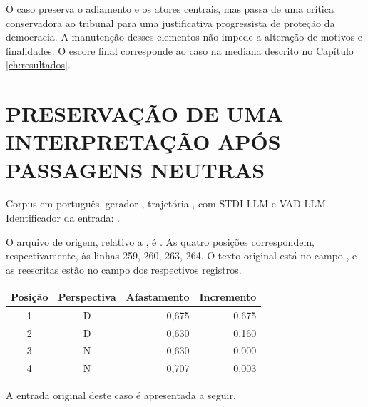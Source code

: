 O caso preserva o adiamento e os atores centrais, mas passa de uma crítica conservadora ao tribunal para uma justificativa progressista de proteção da democracia. A manutenção desses elementos não impede a alteração de motivos e finalidades. O escore final corresponde ao caso na mediana descrito no Capítulo \ref{ch:resultados}.

\section{PRESERVAÇÃO DE UMA INTERPRETAÇÃO APÓS PASSAGENS NEUTRAS}
\label{sec:ap-caso-neutro}

Corpus em português, gerador , trajetória , com STDI LLM e VAD LLM. Identificador da entrada: .

O arquivo de origem, relativo a , é . As quatro posições correspondem, respectivamente, às linhas 259, 260, 263, 264. O texto original está no campo , e as reescritas estão no campo  dos respectivos registros.

\begin{center}
\begin{minipage}{\textwidth}
\centering
{}
\label{tab:ap-caso-neutro}
\begin{tabular}{ccrr}
\hline
Posição & Perspectiva & Afastamento & Incremento \\
\hline
1 & D & 0,675 & 0,675 \\
2 & D & 0,630 & 0,160 \\
3 & N & 0,630 & 0,000 \\
4 & N & 0,707 & 0,003 \\
\hline
\end{tabular}
\end{minipage}
\end{center}

A entrada original deste caso é apresentada a seguir.

